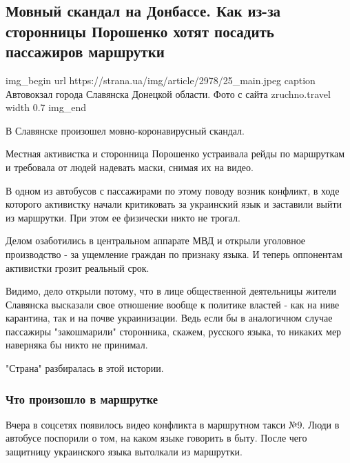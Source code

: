  
 
 

\subsection{Мовный скандал на Донбассе. Как из-за сторонницы Порошенко хотят посадить пассажиров маршрутки}


\ifcmt
img_begin 
	url https://strana.ua/img/article/2978/25_main.jpeg
	caption Автовокзал города Славянска Донецкой области. Фото с сайта zruchno.travel 
	width 0.7
img_end
\fi

В Славянске произошел мовно-коронавирусный скандал.

Местная активистка и сторонница Порошенко устраивала рейды по маршруткам и
требовала от людей надевать маски, снимая их на видео.

В одном из автобусов с пассажирами по этому поводу возник конфликт, в ходе
которого активистку начали критиковать за украинский язык и заставили выйти из
маршрутки. При этом ее физически никто не трогал. 

Делом озаботились в центральном аппарате МВД и открыли уголовное производство -
за ущемление граждан по признаку языка. И теперь оппонентам активистки грозит
реальный срок. 

Видимо, дело открыли потому, что в лице общественной деятельницы жители
Славянска высказали свое отношение вообще к политике властей - как на ниве
карантина, так и на почве украинизации. Ведь если бы в аналогичном случае
пассажиры "закошмарили" сторонника, скажем, русского языка, то никаких мер
наверняка бы никто не принимал.

"Страна" разбиралась в этой истории.  

\subsubsection{Что произошло в маршрутке}

Вчера в соцсетях появилось видео конфликта в маршрутном такси №9. Люди в
автобусе поспорили о том, на каком языке говорить в быту. После чего защитницу
украинского языка вытолкали из маршрутки. 

